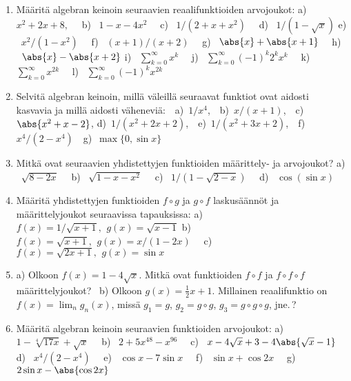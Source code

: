 \Harj
\begin{enumerate}

\item
Määritä algebran keinoin seuraavien reaalifunktioiden arvojoukot: \newline
a) \ $x^2+2x+8,\quad$
b) \ $1-x-4x^2 \quad$
c) \ $1/(2+x+x^2) \quad$
d) \ $1/(1-\sqrt{x})$ \newline
e) \ $x^2/(1-x^2) \quad$
f) \ $(x+1)/(x+2) \quad$
g) \ $\abs{x}+\abs{x+1} \quad$
h) \ $\abs{x}-\abs{x+2}$ \newline
i) \ $\sum_{k=0}^\infty x^k \quad$
j) \ $\sum_{k=0}^\infty (-1)^k 2^k x^k \quad$ 
k) \ $\sum_{k=0}^\infty x^{2k} \quad$
l) \ $\sum_{k=0}^\infty (-1)^k x^{2k}$

\item
Selvitä algebran keinoin, millä väleillä seuraavat funktiot ovat aidosti kasvavia ja millä
aidosti väheneviä: \,\ a)\, $1/x^4$, \,\ b)\, $x/(x+1)$, \,\ c)\, $\abs{x^2+x-2}$, \newline 
d)\, $1/(x^2+2x+2)$, \,\ e)\, $1/(x^2+3x+2)$, \,\ f)\, $x^4/(2-x^4)$ \,\ 
g)\, $\max\{0,\sin x\}$

\item
Mitkä ovat seuraavien yhdistettyjen funktioiden määrittely- ja arvojoukot? \newline
a) \ $\sqrt{8-2x} \quad$ 
b) \ $\sqrt{1-x-x^2}\quad$
c) \ $1/(1-\sqrt{2-x}) \quad$
d) \ $\cos(\sin x)$

\item
Määritä yhdistettyjen funktioiden $f \circ g$ ja $g \circ f$ laskusäännöt ja määrittelyjoukot
seuraavissa tapauksissa: \newline
a) \ $f(x)=1/\sqrt{x+1},\,\ g(x)=\sqrt{x-1}$ \newline
b) \ $f(x)=\sqrt{x+1},\,\ g(x)=x/(1-2x) \quad$ \newline
c) \ $f(x)=\sqrt{2x+1},\,\ g(x)=\sin x$

\item
a) Olkoon $f(x)=1-4\sqrt{x}$. Mitkä ovat funktioiden $f \circ f$ ja $f \circ f \circ f$
määrittelyjoukot? \ b) Olkoon $g(x)=\frac{1}{2}x+1$. Millainen reaalifunktio on 
$f(x)=\lim_n g_n(x)$, missä $g_1=g$, $g_2=g \circ g$, $g_3=g \circ g \circ g$, jne.\,?

\item
Määritä algebran keinoin seuraavien funktioiden arvojoukot: \newline
a) \ $1-\sqrt[4]{17x}+\sqrt{x} \quad$
b) \ $2+5x^{48}-x^{96} \quad$
c) \ $x-4\sqrt{x}+3-4\abs{\sqrt{x}-1}$ \newline
d) \ $x^4/(2-x^4) \quad$
e) \ $\cos x-7\sin x \quad$
f) \ $\sin x + \cos 2x \quad$ 
g) \ $2\sin x - \abs{\cos 2x}$ 


\end{enumerate}
